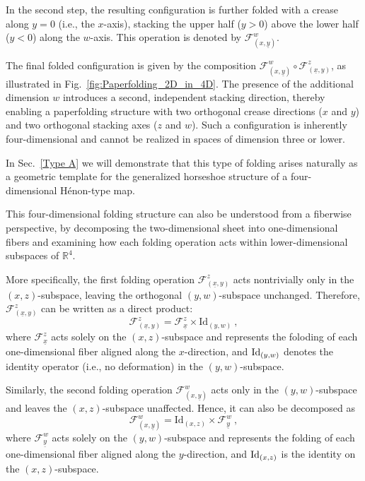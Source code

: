 \documentclass[12pt]{iopart}
\begin{document}
In the second step, the resulting configuration is further folded with a crease along \(y = 0\) (i.e., the \(x\)-axis), stacking the upper half (\(y > 0\)) above the lower half (\(y < 0\)) along the \(w\)-axis. This operation is denoted by \(\mathcal{F}^w_{(x,\underline{y})}\).

The final folded configuration is given by the composition \(\mathcal{F}^w_{(x,\underline{y})} \circ \mathcal{F}^z_{(\underline{x},y)}\), as illustrated in Fig.~\ref{fig:Paperfolding_2D_in_4D}. The presence of the additional dimension \(w\) introduces a second, independent stacking direction, thereby enabling a paperfolding structure with two orthogonal crease directions (\(x\) and \(y\)) and two orthogonal stacking axes (\(z\) and \(w\)). Such a configuration is inherently four-dimensional and cannot be realized in spaces of dimension three or lower.

In Sec.~\ref{Type A} we will demonstrate that this type of folding arises naturally as a geometric template for the generalized horseshoe structure of a four-dimensional H\'{e}non-type map.

This four-dimensional folding structure can also be understood from a fiberwise perspective, by decomposing the two-dimensional sheet into one-dimensional fibers and examining how each folding operation acts within lower-dimensional subspaces of $\mathbb{R}^4$. 

More specifically, the first folding operation $\mathcal{F}^z_{(\underline{x},y)}$ acts nontrivially only in the $(x,z)$-subspace, leaving the orthogonal $(y,w)$-subspace unchanged. Therefore, $\mathcal{F}^z_{(\underline{x},y)}$ can be written as a direct product:
\begin{equation}\label{eq:F z xy decomposition}
\mathcal{F}^z_{(\underline{x},y)} = \mathcal{F}^z_{\underline{x}} \times \mathrm{Id}_{(y,w)}\ ,
\end{equation}
where $\mathcal{F}^z_{\underline{x}}$ acts solely on the $(x,z)$-subspace and represents the foloding of each one-dimensional fiber aligned along the $x$-direction, and ${\rm Id}_{(y,w)}$ denotes the identity operator (i.e., no deformation) in the $(y,w)$-subspace. 

Similarly, the second folding operation $\mathcal{F}^w_{(x,\underline{y})}$ acts only in the $(y,w)$-subspace and leaves the $(x,z)$-subspace unaffected. Hence, it can also be decomposed as 
\begin{equation}\label{eq:F w xy decomposition}
\mathcal{F}^w_{(x,\underline{y})} = \mathrm{Id}_{(x,z)} \times \mathcal{F}^w_{\underline{y}}\ ,
\end{equation}
where $\mathcal{F}^w_{\underline{y}}$ acts solely on the $(y,w)$-subspace and represents the folding of each one-dimensional fiber aligned along the $y$-direction, and ${\rm Id}_{(x,z)}$ is the identity on the $(x,z)$-subspace. 
\end{document}
